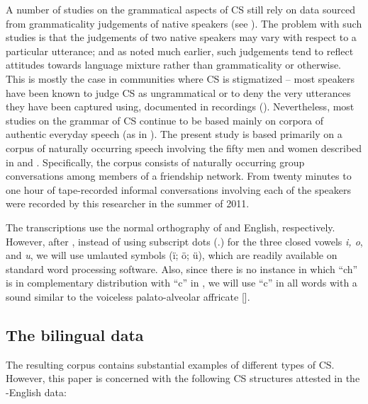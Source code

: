 \documentclass[output=paper]{langsci/langscibook}
\begin{document}
A number of studies on the grammatical aspects of CS still rely on data sourced from grammaticality judgements of native speakers (see \citealt{MacSwan2009}). The problem with such studies is that the judgements of two native speakers may vary with respect to a particular utterance; and as \citet{Daller1991} noted much earlier, such judgements tend to reflect attitudes towards language mixture rather than grammaticality or otherwise. This is mostly the case in communities where CS is stigmatized – most speakers have been known to judge CS as ungrammatical or to deny the very utterances they have been captured using, documented in recordings (\citealt[99]{MacSwan1999}). Nevertheless, most studies on the grammar of CS continue to be based mainly on corpora of authentic everyday speech (as in \citealt{MyersScottonJake2014}). The present study is based primarily on a corpus of naturally occurring speech involving the fifty men and women described in  and . Specifically, the corpus consists of naturally occurring group conversations among members of a friendship network. From twenty minutes to one hour of tape-recorded informal conversations involving each of the speakers were recorded by this researcher in the summer of 2011. 

The transcriptions use the normal orthography of  and English, respectively. However, after \citet{Echeruo1998}, instead of using subscript dots (.) for the three  closed vowels \textit{i, o}, and \textit{u}, we will use umlauted symbols (ï; ö; ü), which are readily available on standard word processing software. Also, since there is no instance in which “ch” is in complementary distribution with “c” in , we will use “c” in all  words with a sound similar to the voiceless palato-alveolar affricate []. 

\subsection{The bilingual data}

The resulting corpus contains substantial examples of different types of CS. However, this paper is concerned with the following CS structures attested in the -English data:
\end{document}
